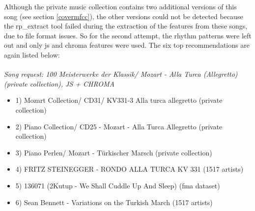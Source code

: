 \noindent Although the private music collection contains two additional versions of this song (see section \ref{covermfcc}), the other versions could not be detected because the rp\_extract tool failed during the extraction of the features from these songs, due to file format issues. So for the second attempt, the rhythm patterns were left out and only js and chroma features were used. The six top recommendations are again listed below:\\
\ \\
\textit{\noindent Song request: 100 Meisterwerke der Klassik/ Mozart - Alla Turca (Allegretto) (private collection), JS + CHROMA}

\begin{itemize}
	\setlength\itemsep{-0.5em}
	\item 1) Mozart Collection/ CD31/ KV331-3 Alla turca allegretto (private collection)
	\item 2) Piano Collection/ CD25 - Mozart - Alla Turca Allegretto (private collection)
	\item 3) Piano Perlen/ Mozart - Türkischer Marsch (private collection)
	\item 4) FRITZ STEINEGGER - RONDO ALLA TURCA KV 331 (1517 artists)
	\item 5) 136071 (2Kutup - We Shall Cuddle Up And Sleep) (fma dataset) 
	\item 6) Sean Bennett - Variations on the Turkish March (1517 artists)
\end{itemize}

